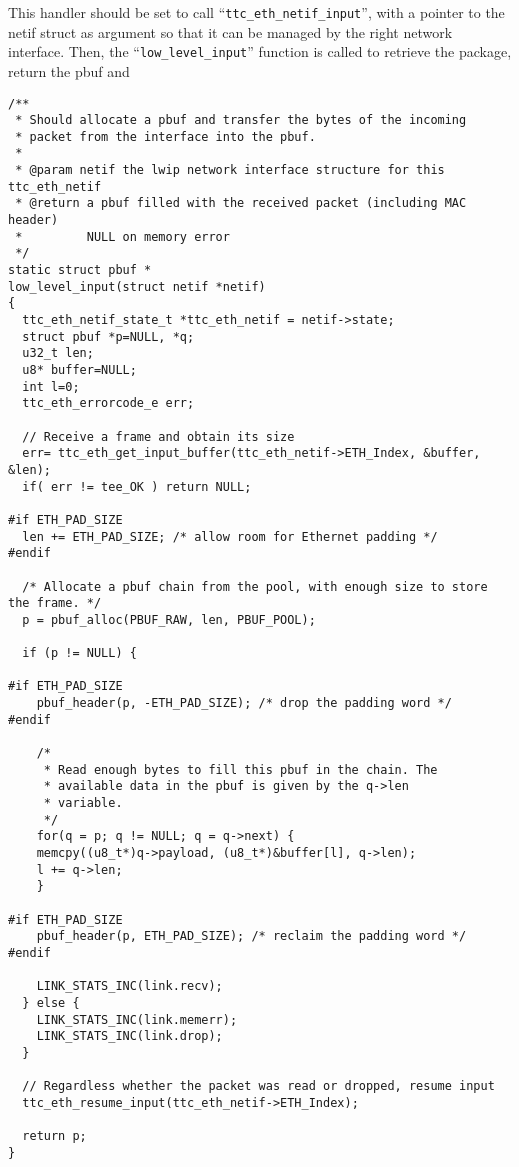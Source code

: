 This handler should be set to call ``\verb/ttc_eth_netif_input/'', with a pointer to the netif struct as argument so that it can be managed by the right network interface. Then, the ``\verb/low_level_input/'' function is called to retrieve the package, return the pbuf and 

\begin{lstlisting}
/**
 * Should allocate a pbuf and transfer the bytes of the incoming
 * packet from the interface into the pbuf.
 *
 * @param netif the lwip network interface structure for this ttc_eth_netif
 * @return a pbuf filled with the received packet (including MAC header)
 *         NULL on memory error
 */
static struct pbuf *
low_level_input(struct netif *netif)
{
  ttc_eth_netif_state_t *ttc_eth_netif = netif->state;
  struct pbuf *p=NULL, *q;
  u32_t len;
  u8* buffer=NULL;
  int l=0;
  ttc_eth_errorcode_e err;

  // Receive a frame and obtain its size
  err= ttc_eth_get_input_buffer(ttc_eth_netif->ETH_Index, &buffer, &len);
  if( err != tee_OK ) return NULL;
  
#if ETH_PAD_SIZE
  len += ETH_PAD_SIZE; /* allow room for Ethernet padding */
#endif

  /* Allocate a pbuf chain from the pool, with enough size to store the frame. */
  p = pbuf_alloc(PBUF_RAW, len, PBUF_POOL);
  
  if (p != NULL) {

#if ETH_PAD_SIZE
    pbuf_header(p, -ETH_PAD_SIZE); /* drop the padding word */
#endif

    /*
     * Read enough bytes to fill this pbuf in the chain. The
     * available data in the pbuf is given by the q->len
     * variable.
     */
    for(q = p; q != NULL; q = q->next) {
	memcpy((u8_t*)q->payload, (u8_t*)&buffer[l], q->len);
	l += q->len;
    }
   
#if ETH_PAD_SIZE
    pbuf_header(p, ETH_PAD_SIZE); /* reclaim the padding word */
#endif
    
    LINK_STATS_INC(link.recv);
  } else {
    LINK_STATS_INC(link.memerr);
    LINK_STATS_INC(link.drop);
  }

  // Regardless whether the packet was read or dropped, resume input
  ttc_eth_resume_input(ttc_eth_netif->ETH_Index);
  
  return p;  
}
\end{lstlisting}





